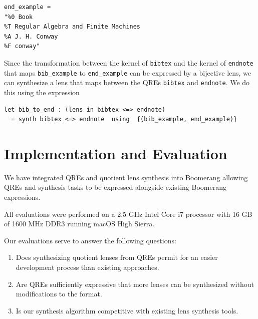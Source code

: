 \documentclass{svproc}
\newcommand{\cd}[1]{\lstinline[backgroundcolor=\color{white}]$#1$}
\begin{document}
\begin{lstlisting}
end_example = 
"%0 Book
%T Regular Algebra and Finite Machines
%A J. H. Conway
%F conway"
\end{lstlisting}

Since the transformation between the kernel of \cd{bibtex} and the kernel of
\cd{endnote} that maps \cd{bib_example} to \cd{end_example} can be
expressed by a bijective lens, we can synthesize a lens that maps between the
QREs \cd{bibtex} and \cd{endnote}. We do this using the expression

\begin{lstlisting}
let bib_to_end : (lens in bibtex <=> endnote) 
  = synth bibtex <=> endnote  using  {(bib_example, end_example)}
\end{lstlisting}

\section{Implementation and Evaluation}
\label{impl}


We have integrated QREs and quotient lens synthesis into Boomerang allowing QREs
and synthesis tasks to be expressed alongside existing Boomerang expressions.

All evaluations were performed on a 2.5 GHz Intel Core i7 processor with 16 GB
of 1600 MHz DDR3 running macOS High Sierra.

Our evaluations serve to answer the following questions:
\begin{enumerate}
\item Does synthesizing quotient lenses from QREs permit for an easier
  development process than existing approaches.

\item Are QREs sufficiently expressive that more lenses can be synthesized
  without modifications to the format. 

\item Is our synthesis algorithm competitive with existing lens synthesis
  tools.
\end{enumerate}
\end{document}
